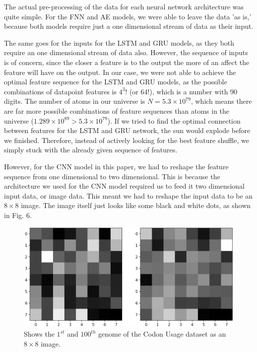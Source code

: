 \documentclass[conference]{IEEEtran}
\begin{document}
The actual pre-processing of the data for each neural network architecture was quite simple. For the FNN and AE models, we were able to leave the data 'as is,' because both models require just a one dimensional stream of data as their input. 

The same goes for the inputs for the LSTM and GRU models, as they both require an one dimensional stream of data also. However, the sequence of inputs is of concern, since the closer a feature is to the output the more of an affect the feature will have on the output\cite{Rabie}. In our case, we were not able to achieve the optimal feature sequence for the LSTM and GRU models, as the possible combinations of datapoint features is $4^3!$ (or 64!)\cite{Bayer}, which is a number with 90 digits. The number of atoms in our universe is $N = 5.3 \times 10^{79}$\cite{Planck Collaboration}, which means there are far more possible combinations of feature sequences than atoms in the universe ($1.289 \times 10^{89} > 5.3 \times 10^{79}$). If we tried to find the optimal connection between features for the LSTM and GRU network, the sun would explode before we finished\cite{Krauss}. Therefore, instead of actively looking for the best feature shuffle, we simply stuck with the already given sequence of features.

However, for the CNN model in this paper, we had to reshape the feature sequence from one dimensional to two dimensional\cite{Ghosh}. This is because the architecture we used for the CNN model required us to feed it two dimensional input data, or image data. This meant we had to reshape the input data to be an $8 \times 8$ image. The image itself just looks like some black and white dots, as shown in Fig. 6. 

\begin{figure}[htbp]
\centerline{\includegraphics[scale=0.26]{Codon Display}}
\caption{Shows the $1^{st}$ and $100^{th}$ genome of the Codon Usage dataset as an $8 \times 8$ image.}
\label{fig}
\end{figure}
\end{document}
